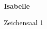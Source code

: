 \documentclass[a4paper]{article}
\begin{document}
\printGenericVSLHeader
\begin{center}
\begin{vsltext}{3cm}{4cm}

   \vspace{0.5cm} 

    \textbf{Isabelle} 

    \vspace{1.5cm}

    Zeichensaal 1

\end{vsltext}

\end{center}
\end{document}
